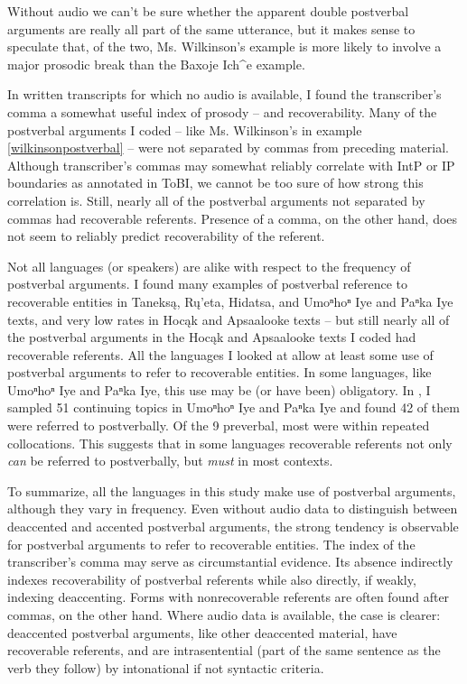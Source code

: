 \documentclass[output=paper]{LSP/langsci}
\begin{document}
Without audio we can’t be sure whether the apparent double postverbal arguments are really all part of the same utterance, but it makes sense to speculate that, of the two, Ms. Wilkinson’s example is more likely to involve a major prosodic break than the Baxoje Ich\^{}e example.

In written transcripts for which no audio is available, I found the transcriber’s comma a somewhat useful index of prosody -- and recoverability. Many of the postverbal arguments I coded -- like Ms. Wilkinson’s in example \ref{wilkinsonpostverbal} -- were not separated by commas from preceding material. Although transcriber’s commas may somewhat reliably correlate with IntP or IP boundaries as annotated in ToBI, we cannot be too sure of how strong this correlation is. Still, nearly all of the postverbal arguments not separated by commas had recoverable referents. Presence of a comma, on the other hand, does not seem to reliably predict recoverability of the referent.

Not all languages (or speakers) are alike with respect to the frequency of postverbal arguments. I found many examples of postverbal reference to recoverable entities in Taneksą, Rų’eta, Hidatsa, and Umoⁿhoⁿ Iye and Paⁿka Iye texts, and very low rates in Hocąk and Apsaalooke texts -- but still nearly all of the postverbal arguments in the Hocąk and Apsaalooke texts I coded had recoverable referents. All the languages I looked at allow at least some use of postverbal arguments to refer to recoverable entities. In some languages, like Umoⁿhoⁿ Iye and Paⁿka Iye, this use may be (or have been) obligatory. In \citet{Gordon2008}, I sampled 51 continuing topics in Umoⁿhoⁿ Iye and Paⁿka Iye and found 42 of them were referred to postverbally. Of the 9 preverbal, most were within repeated collocations. This suggests that in some languages recoverable referents not only \emph{can} be referred to postverbally, but \emph{must} in most contexts.

To summarize, all the languages in this study make use of postverbal arguments, although they vary in frequency. Even without audio data to distinguish between deaccented and accented postverbal arguments, the strong tendency is observable for postverbal arguments to refer to recoverable entities. The index of the transcriber’s comma may serve as circumstantial evidence. Its absence indirectly indexes recoverability of postverbal referents while also directly, if weakly, indexing deaccenting. Forms with nonrecoverable referents are often found after commas, on the other hand. Where audio data is available, the case is clearer: deaccented postverbal arguments, like other deaccented material, have recoverable referents, and are intrasentential (part of the same sentence as the verb they follow) by intonational if not syntactic criteria.
\end{document}
